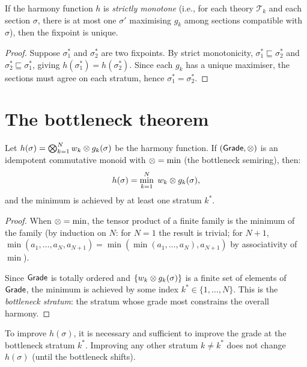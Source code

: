 \begin{proposition}
\label{prop:harmony-unique}
If the harmony function $h$ is \emph{strictly monotone} (i.e., for
each theory $\mathcal{T}_k$ and each section $\sigma$, there is at
most one $\sigma'$ maximising $g_k$ among sections compatible
with $\sigma$), then the fixpoint is unique.
\end{proposition}

\begin{proof}
Suppose $\sigma_1^*$ and $\sigma_2^*$ are two fixpoints.
By strict monotonicity, $\sigma_1^* \sqsubseteq \sigma_2^*$ and
$\sigma_2^* \sqsubseteq \sigma_1^*$, giving
$h(\sigma_1^*) = h(\sigma_2^*)$.  Since each $g_k$ has a unique
maximiser, the sections must agree on each stratum, hence
$\sigma_1^* = \sigma_2^*$.
\end{proof}

\section{The bottleneck theorem}
\label{sec:bottleneck}

\begin{theorem}
\label{thm:bottleneck}
Let $h(\sigma) = \bigotimes_{k=1}^{N} w_k \otimes g_k(\sigma)$ be the
harmony function.  If $(\mathsf{Grade}, \otimes)$ is an idempotent commutative
monoid with $\otimes = \min$ (the bottleneck semiring), then:
\[
  h(\sigma) = \min_{k=1}^{N}\; w_k \otimes g_k(\sigma),
\]
and the minimum is achieved by at least one stratum $k^*$.
\end{theorem}

\begin{proof}
When $\otimes = \min$, the tensor product of a finite family is the
minimum of the family (by induction on $N$: for $N = 1$ the result is
trivial; for $N+1$, $\min(a_1, \ldots, a_N, a_{N+1}) =
\min(\min(a_1, \ldots, a_N), a_{N+1})$ by associativity of $\min$).

Since $\mathsf{Grade}$ is totally ordered and $\{w_k \otimes g_k(\sigma)\}$ is
a finite set of elements of $\mathsf{Grade}$, the minimum is achieved by
some index $k^* \in \{1, \ldots, N\}$.  This is the
\emph{bottleneck stratum}: the stratum whose grade most constrains
the overall harmony.
\end{proof}

\begin{corollary}
\label{cor:bottleneck-repair}
To improve $h(\sigma)$, it is necessary and sufficient to improve the
grade at the bottleneck stratum $k^*$.  Improving any other stratum
$k \neq k^*$ does not change $h(\sigma)$ (until the bottleneck
shifts).
\end{corollary}

